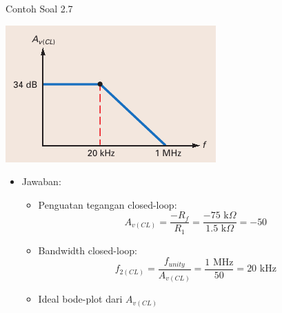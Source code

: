 \begin{frame}[t]{Contoh Soal 2.7}
	\begin{multicols}{2}
		\begin{center}
			\includegraphics[width=\linewidth]{gambar/fig-16.16b}
		\end{center}
		\columnbreak
		\begin{itemize}
			\item Jawaban:
			\begin{itemize}
				\item Penguatan tegangan closed-loop:
				\[ A_{v(CL)} = \frac{-R_f}{R_1} = \frac{-75 \text{ k}\Omega}{1.5 \text{ k}\Omega} = -50\]
				\item Bandwidth closed-loop:
				\[ f_{2(CL)} = \frac{f_{unity}}{A_{v(CL)}} = \frac{1 \text{ MHz}}{50} = 20 \text{ kHz}\]
				\item Ideal bode-plot dari $ A_{v(CL)} $
			\end{itemize}
		\end{itemize}
	\end{multicols}
\end{frame}

